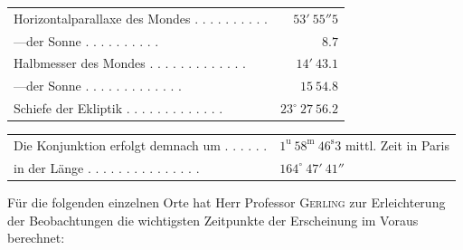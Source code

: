 \begin{center}\small\setlength{\tabcolsep}{3pt}
\begin{tabular}{lr}
Horizontalparallaxe des Mondes . . . . . . . . . . & $53'\ 55''5$ \\
\hspace{1em}---\hspace{1em}der Sonne . . . . . . . . . . & $8.7$ \\
Halbmesser des Mondes . . . . . . . . . . . . . & $14'\ 43.1$ \\
\hspace{1em}---\hspace{1em}der Sonne . . . . . . . . . . . . . & $15\ 54.8$ \\
Schiefe der Ekliptik . . . . . . . . . . . . . & $23^\circ\ 27\ 56.2$ \\
\end{tabular}
\begin{tabular}{ll}
Die Konjunktion erfolgt demnach um . . . . . . & $1^{\mathrm u}\ 58^{\mathrm m}\ 46^{\mathrm s}3$ mittl. Zeit in Paris \\
in der Länge . . . . . . . . . . . . . . . & $164^\circ\ 47'\ 41''$ \\
\end{tabular}
\end{center}

Für die folgenden einzelnen Orte hat Herr Professor \textsc{Gerling} zur Erleichterung der Beobachtungen die wichtigsten Zeitpunkte der Erscheinung im Voraus berechnet:

